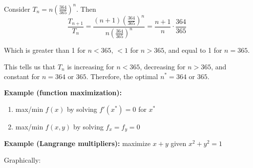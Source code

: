 \documentclass[12pt]{article}
\begin{document}
        Consider $T_n = n \left(\frac{364}{365}\right)^n$. Then 
        \[\frac{T_{n+1}}{T_n} = \frac{(n + 1) \left(\frac{364}{365}\right)^n}{n\left(\frac{364}{365}\right)^n} = \frac{n + 1}{n} \cdot \frac{364}{365}\]
        
        Which is greater than 1 for $n < 365$, $< 1$ for $n > 365$, and equal to 1 for $n = 365$. 

        This tells us that $T_n$ is increasing for $n < 365$, decreasing for $n > 365$, and constant for $n = 364 \text{ or } 365$. Therefore, the optimal $n^* = 364$ or $365$.

        \textbf{Example (function maximization):} 
        \begin{enumerate}
            \item max/min $f(x)$ by solving $f'(x^*) = 0$ for $x^*$ 
            \item max/min $f(x, y)$ by solving $f_x = f_y = 0$ 
        \end{enumerate}

        \textbf{Example (Langrange multipliers):} maximize $x + y$ given $x^2 + y^2 =1$ 

        Graphically: 
        \begin{center}
            \end{center}
\end{document}

